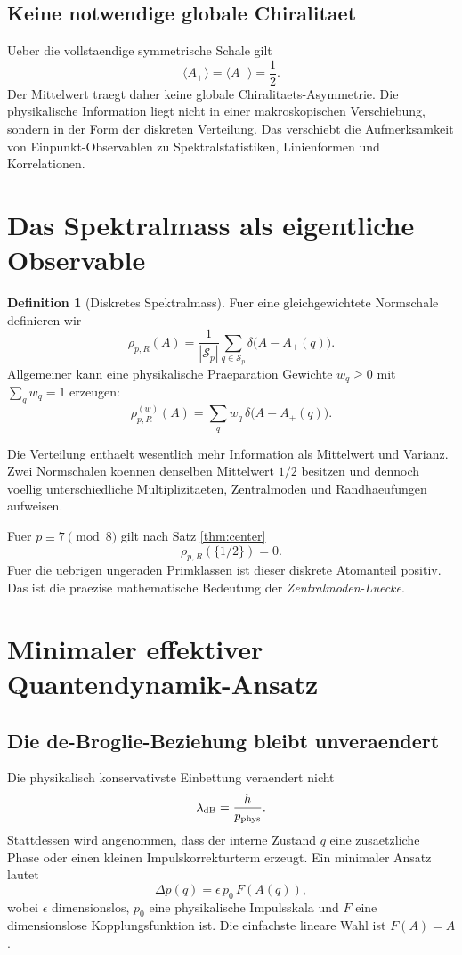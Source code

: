 \documentclass[11pt,a4paper]{article}
\theoremstyle{definition}
\newtheorem{definition}[satz]{Definition}
\begin{document}
\subsection{Keine notwendige globale Chiralitaet}
Ueber die vollstaendige symmetrische Schale gilt
\[
\langle A_+\rangle=\langle A_-\rangle=\frac12.
\]
Der Mittelwert traegt daher keine globale Chiralitaets-Asymmetrie. Die physikalische Information liegt nicht in einer makroskopischen Verschiebung, sondern in der Form der diskreten Verteilung. Das verschiebt die Aufmerksamkeit von Einpunkt-Observablen zu Spektralstatistiken, Linienformen und Korrelationen.

\section{Das Spektralmass als eigentliche Observable}
\begin{definition}[Diskretes Spektralmass]
Fuer eine gleichgewichtete Normschale definieren wir
\[
\rho_{p,R}(A)
=\frac1{|\mathcal S_p|}\sum_{q\in\mathcal S_p}
\delta\bigl(A-A_+(q)\bigr).
\]
Allgemeiner kann eine physikalische Praeparation Gewichte $w_q\ge0$ mit $\sum_qw_q=1$ erzeugen:
\[
\rho^{(w)}_{p,R}(A)
=\sum_qw_q\,\delta\bigl(A-A_+(q)\bigr).
\]
\end{definition}

Die Verteilung enthaelt wesentlich mehr Information als Mittelwert und Varianz. Zwei Normschalen koennen denselben Mittelwert $1/2$ besitzen und dennoch voellig unterschiedliche Multiplizitaeten, Zentralmoden und Randhaeufungen aufweisen.

Fuer $p\equiv7\pmod8$ gilt nach Satz \ref{thm:center}
\[
\rho_{p,R}(\{1/2\})=0.
\]
Fuer die uebrigen ungeraden Primklassen ist dieser diskrete Atomanteil positiv. Das ist die praezise mathematische Bedeutung der \emph{Zentralmoden-Luecke}.

\section{Minimaler effektiver Quantendynamik-Ansatz}
\subsection{Die de-Broglie-Beziehung bleibt unveraendert}
Die physikalisch konservativste Einbettung veraendert nicht
\[
\lambda_{\rm dB}=\frac{h}{p_{\rm phys}}.
\]
Stattdessen wird angenommen, dass der interne Zustand $q$ eine zusaetzliche Phase oder einen kleinen Impulskorrekturterm erzeugt. Ein minimaler Ansatz lautet
\[
\Delta p(q)=\epsilon\,p_0\,F(A(q)),
\]
wobei $\epsilon$ dimensionslos, $p_0$ eine physikalische Impulsskala und $F$ eine dimensionslose Kopplungsfunktion ist. Die einfachste lineare Wahl ist $F(A)=A$.
\end{document}
